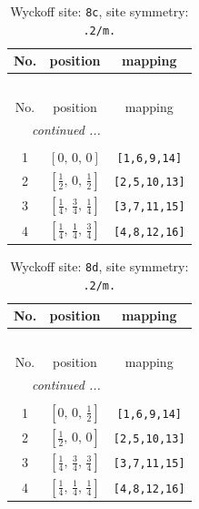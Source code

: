 \documentclass[fleqn,8pt]{jsarticle}
\begin{document}
\renewcommand{\arraystretch}{1.2}
\begin{longtable}{ccc}
\caption{Wyckoff site: {\tt 8c}, site symmetry: {\tt .2/m.}}
 \\
 \hline \hline
No. & position & mapping \\ \hline \endfirsthead

\multicolumn{2}{l}{\tablename\ \thetable{}} \\
 \hline \hline
No. & position & mapping \\ \hline \endhead

 \hline \hline
\multicolumn{2}{r}{\footnotesize\it continued ...} \\ \endfoot

 \hline \hline
\multicolumn{2}{r}{} \\ \endlastfoot

1 & $\left[ 0,\, 0,\, 0 \right]$ & {\tt [1,6,9,14]} \\ \hline
2 & $\left[ \frac{1}{2},\, 0,\, \frac{1}{2} \right]$ & {\tt [2,5,10,13]} \\ \hline
3 & $\left[ \frac{1}{4},\, \frac{3}{4},\, \frac{1}{4} \right]$ & {\tt [3,7,11,15]} \\ \hline
4 & $\left[ \frac{1}{4},\, \frac{1}{4},\, \frac{3}{4} \right]$ & {\tt [4,8,12,16]} \\
\end{longtable}
\renewcommand{\arraystretch}{1.2}
\begin{longtable}{ccc}
\caption{Wyckoff site: {\tt 8d}, site symmetry: {\tt .2/m.}}
 \\
 \hline \hline
No. & position & mapping \\ \hline \endfirsthead

\multicolumn{2}{l}{\tablename\ \thetable{}} \\
 \hline \hline
No. & position & mapping \\ \hline \endhead

 \hline \hline
\multicolumn{2}{r}{\footnotesize\it continued ...} \\ \endfoot

 \hline \hline
\multicolumn{2}{r}{} \\ \endlastfoot

1 & $\left[ 0,\, 0,\, \frac{1}{2} \right]$ & {\tt [1,6,9,14]} \\ \hline
2 & $\left[ \frac{1}{2},\, 0,\, 0 \right]$ & {\tt [2,5,10,13]} \\ \hline
3 & $\left[ \frac{1}{4},\, \frac{3}{4},\, \frac{3}{4} \right]$ & {\tt [3,7,11,15]} \\ \hline
4 & $\left[ \frac{1}{4},\, \frac{1}{4},\, \frac{1}{4} \right]$ & {\tt [4,8,12,16]} \\
\end{longtable}
\end{document}
